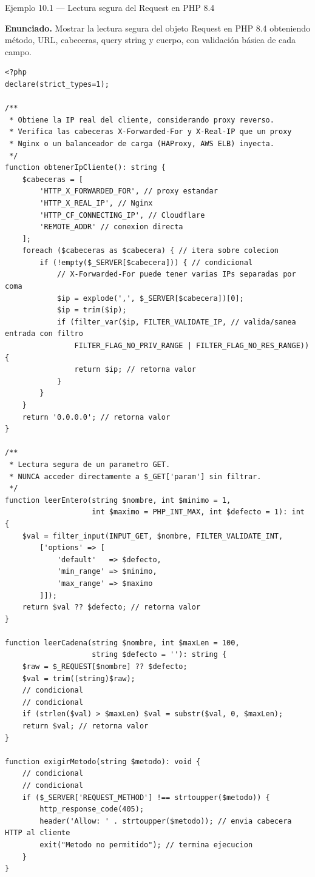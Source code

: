 \begin{cajaejemplo}{Ejemplo 10.1 --- Lectura segura del Request en PHP 8.4}

\textbf{Enunciado.} Mostrar la lectura segura del objeto Request en PHP 8.4 obteniendo método, URL, cabeceras, query string y cuerpo, con validación básica de cada campo.

\begin{lstlisting}[style=php,caption={request-helpers.php},label=lst:10.4]
<?php
declare(strict_types=1);

/**
 * Obtiene la IP real del cliente, considerando proxy reverso.
 * Verifica las cabeceras X-Forwarded-For y X-Real-IP que un proxy
 * Nginx o un balanceador de carga (HAProxy, AWS ELB) inyecta.
 */
function obtenerIpCliente(): string {
    $cabeceras = [
        'HTTP_X_FORWARDED_FOR', // proxy estandar
        'HTTP_X_REAL_IP', // Nginx
        'HTTP_CF_CONNECTING_IP', // Cloudflare
        'REMOTE_ADDR' // conexion directa
    ];
    foreach ($cabeceras as $cabecera) { // itera sobre colecion
        if (!empty($_SERVER[$cabecera])) { // condicional
            // X-Forwarded-For puede tener varias IPs separadas por coma
            $ip = explode(',', $_SERVER[$cabecera])[0];
            $ip = trim($ip);
            if (filter_var($ip, FILTER_VALIDATE_IP, // valida/sanea entrada con filtro
                FILTER_FLAG_NO_PRIV_RANGE | FILTER_FLAG_NO_RES_RANGE)) {
                return $ip; // retorna valor
            }
        }
    }
    return '0.0.0.0'; // retorna valor
}

/**
 * Lectura segura de un parametro GET.
 * NUNCA acceder directamente a $_GET['param'] sin filtrar.
 */
function leerEntero(string $nombre, int $minimo = 1,
                    int $maximo = PHP_INT_MAX, int $defecto = 1): int {
    $val = filter_input(INPUT_GET, $nombre, FILTER_VALIDATE_INT,
        ['options' => [
            'default'   => $defecto,
            'min_range' => $minimo,
            'max_range' => $maximo
        ]]);
    return $val ?? $defecto; // retorna valor
}

function leerCadena(string $nombre, int $maxLen = 100,
                    string $defecto = ''): string {
    $raw = $_REQUEST[$nombre] ?? $defecto;
    $val = trim((string)$raw);
    // condicional
    // condicional
    if (strlen($val) > $maxLen) $val = substr($val, 0, $maxLen);
    return $val; // retorna valor
}

function exigirMetodo(string $metodo): void {
    // condicional
    // condicional
    if ($_SERVER['REQUEST_METHOD'] !== strtoupper($metodo)) {
        http_response_code(405);
        header('Allow: ' . strtoupper($metodo)); // envia cabecera HTTP al cliente
        exit("Metodo no permitido"); // termina ejecucion
    }
}


\end{lstlisting}
\end{cajaejemplo}
